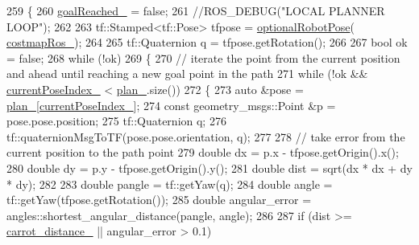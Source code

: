 \begin{DoxyCode}
259 \{
260     \hyperlink{classcl__move__base__z_1_1forward__local__planner_1_1ForwardLocalPlanner_a9d51ad6f0eb364ebd830526280bdf4fc}{goalReached\_} = \textcolor{keyword}{false};
261     \textcolor{comment}{//ROS\_DEBUG("LOCAL PLANNER LOOP");}
262 
263     tf::Stamped<tf::Pose> tfpose = \hyperlink{namespacecl__move__base__z_1_1forward__local__planner_a4c20f9fe0ca67779c53e90182baf4997}{optionalRobotPose}(
      \hyperlink{classcl__move__base__z_1_1forward__local__planner_1_1ForwardLocalPlanner_a37791fea67ce92c6e38e3727311e533b}{costmapRos\_});
264 
265     tf::Quaternion q = tfpose.getRotation();
266 
267     \textcolor{keywordtype}{bool} ok = \textcolor{keyword}{false};
268     \textcolor{keywordflow}{while} (!ok)
269     \{
270         \textcolor{comment}{// iterate the point from the current position and ahead until reaching a new goal point in the
       path}
271         \textcolor{keywordflow}{while} (!ok && \hyperlink{classcl__move__base__z_1_1forward__local__planner_1_1ForwardLocalPlanner_af4019077a7661d10957cca16222547c2}{currentPoseIndex\_} < \hyperlink{classcl__move__base__z_1_1forward__local__planner_1_1ForwardLocalPlanner_a929e5d0a9db3027810beb658a2343560}{plan\_}.size())
272         \{
273             \textcolor{keyword}{auto} &pose = \hyperlink{classcl__move__base__z_1_1forward__local__planner_1_1ForwardLocalPlanner_a929e5d0a9db3027810beb658a2343560}{plan\_}[\hyperlink{classcl__move__base__z_1_1forward__local__planner_1_1ForwardLocalPlanner_af4019077a7661d10957cca16222547c2}{currentPoseIndex\_}];
274             \textcolor{keyword}{const} geometry\_msgs::Point &p = pose.pose.position;
275             tf::Quaternion q;
276             tf::quaternionMsgToTF(pose.pose.orientation, q);
277 
278             \textcolor{comment}{// take error from the current position to the path point}
279             \textcolor{keywordtype}{double} dx = p.x - tfpose.getOrigin().x();
280             \textcolor{keywordtype}{double} dy = p.y - tfpose.getOrigin().y();
281             \textcolor{keywordtype}{double} dist = sqrt(dx * dx + dy * dy);
282 
283             \textcolor{keywordtype}{double} pangle = tf::getYaw(q);
284             \textcolor{keywordtype}{double} angle = tf::getYaw(tfpose.getRotation());
285             \textcolor{keywordtype}{double} angular\_error = angles::shortest\_angular\_distance(pangle, angle);
286 
287             \textcolor{keywordflow}{if} (dist >= \hyperlink{classcl__move__base__z_1_1forward__local__planner_1_1ForwardLocalPlanner_a4101afebb7e2a5eb0a2144a5fb553a92}{carrot\_distance\_} || angular\_error > 0.1)

\end{DoxyCode}
